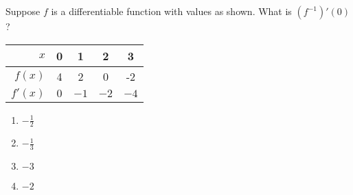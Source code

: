 \item Suppose $f$ is a differentiable function with values as shown. What is $\displaystyle (f^{-1})'(0)$?  


	\begin{tabular}{r|c|c|c|c}
	$x$ & 0 & 1 & 2 & 3 \\
	\hline
	$f(x)$ & 4 & 2 & 0 & -2 \\
	\hline
	$f'(x)$ & $0$ & $-1$ & $-2$ & $-4$ 
	\end{tabular}

\begin{multicols}{2}	
\begin{enumerate}\setlength{\itemsep}{.4 cm}
	\item $-\frac12$ %
	\item $-\frac13$ 
	\item$-3$
	\item $-2$
	\end{enumerate}
\end{multicols}